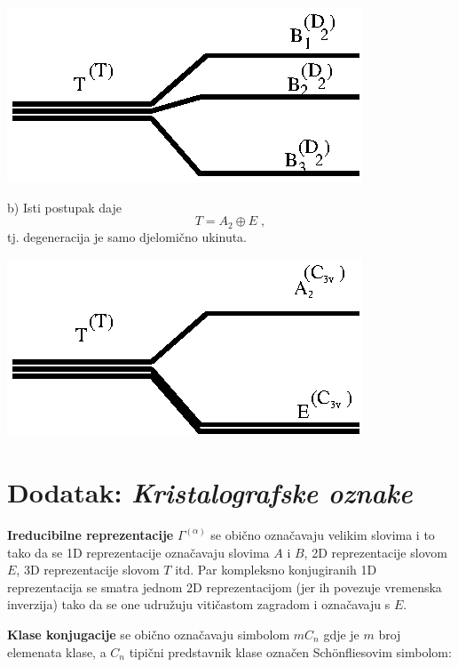 \begin{primjer}
\centerline{\includegraphics[scale=1.0]{pics/splittingT.eps}}

b) Isti postupak daje
\begin{displaymath}
        T = A_2 \oplus E \;,
\end{displaymath}
tj. degeneracija je samo djelomično ukinuta.

\centerline{\includegraphics[scale=1.0]{pics/splittingT2.eps}}

\end{primjer}

\section{Dodatak: \emph{Kristalografske oznake}}

\textbf{Ireducibilne reprezentacije} $\Gamma^{(\alpha)}$ se obično označavaju
velikim slovima i to tako da se 1D reprezentacije označavaju slovima
$A$ i $B$, 2D reprezentacije slovom $E$, 3D reprezentacije slovom $T$
itd. Par kompleksno konjugiranih 1D reprezentacija se smatra jednom
2D reprezentacijom (jer ih povezuje vremenska inverzija) tako da se
one udružuju vitičastom zagradom i označavaju s $E$.

\textbf{Klase konjugacije} se obično označavaju simbolom $mC_n$ gdje je $m$
broj elemenata klase, a $C_n$ tipični predstavnik klase označen
Sch\"{o}nfliesovim simbolom:

